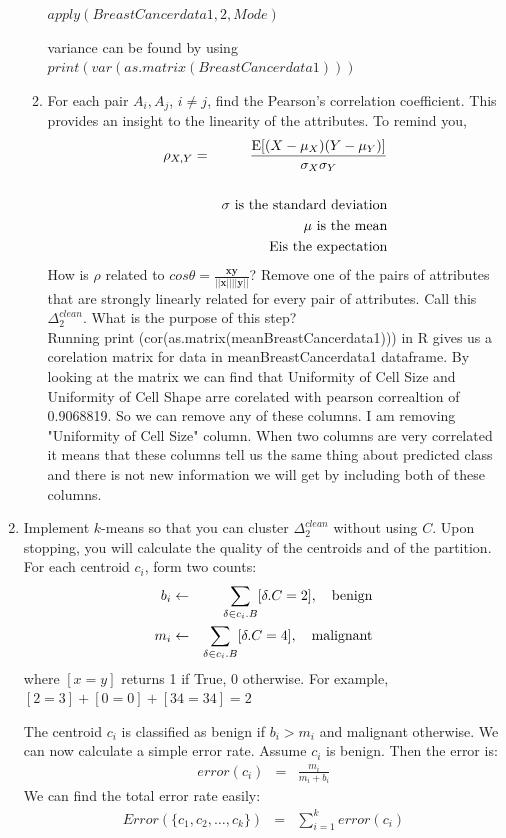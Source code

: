 \documentclass{article}
\begin{document}
\begin{enumerate}
\begin{enumerate}
$apply(BreastCancerdata1,2,Mode)$

variance can be found by using $print (var(as.matrix(BreastCancerdata1)))$

 \item For each pair $A_i, A_j$, $i \neq j$, find the Pearson's correlation coefficient. This provides an insight to the linearity of the attributes.  To remind you,
 \begin{eqnarray*}
 \rho_{X,Y} &=& \frac{\mathrm{E}[(X - \mu_X)(Y-\mu_Y)]}{\sigma_X\sigma_Y}\\
 &&\\
 &&\sigma\ \mbox{\rm is the standard deviation}\\
 && \mu\ \mbox{\rm is the mean} \\
 &&\ \mathrm{E} \mbox{\rm is the expectation}
 \end{eqnarray*}
 How is $\rho$ related to $cos \theta = \frac{\mathbf{x}\mathbf{y}}{||\mathbf{x}|| ||\mathbf{y}||}$?  Remove one of the pairs of attributes that are strongly linearly related for every pair of attributes.  Call this $\Delta_2^{clean}$.  What is the purpose of this step? \\
Running print (cor(as.matrix(meanBreastCancerdata1))) in R gives us a corelation matrix for data in meanBreastCancerdata1 dataframe. By looking at the matrix we can find that Uniformity of Cell Size and Uniformity of Cell Shape arre corelated with pearson correaltion of 0.9068819. So we can remove any of these columns. I am removing "Uniformity of Cell Size" column. When two columns are very correlated it means that these columns tell us the same thing about predicted class and there is not new information we will get by including both of these columns.
 \end{enumerate} 
  \item  Implement $k$-means so that you can cluster $\Delta_2^{clean}$ without using $C$.  Upon stopping, you will calculate the quality of the centroids and of the partition.  For each centroid $c_i$, form two counts:
  \begin{eqnarray*}
  b_i &\gets& \sum_{\delta \in c_i.B} [\delta.C = 2],\ \ \ \mbox{\rm benign}\\
  m_i &\gets& \sum_{\delta \in c_i.B} [\delta.C = 4], \ \ \ \mbox{\rm malignant}
  \end{eqnarray*}
  where $[x = y]$ returns 1 if True, 0 otherwise.  For example, $[2 = 3] + [0 = 0] + [34 = 34] = 2$
  
  The centroid $c_i$ is classified as benign if $b_i > m_i$ and malignant otherwise.  We can now calculate a simple error rate.    Assume $c_i$ is benign.  Then the error is:
 \begin{eqnarray*}
 error(c_i) &=& \frac{m_i}{m_i + b_i}
 \end{eqnarray*}
 We can find the total error rate easily:
 \begin{eqnarray*}
 Error(\{c_1, c_2, \ldots, c_k\}) &=& \sum_{i=1}^k error(c_i)
 \end{eqnarray*}


\end{enumerate}
\end{document}
